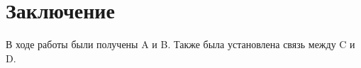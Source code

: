 \chapter{Заключение}\label{ch:conclusion}
В ходе работы были получены A и B. Также была установлена связь между C и D.